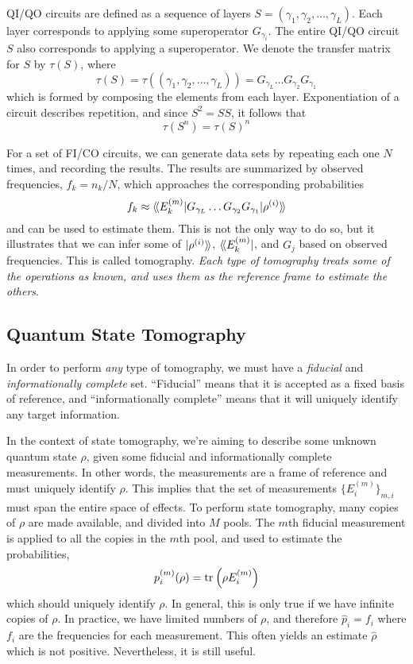 QI/QO circuits are defined as a sequence of layers $S = (\gamma_1, \gamma_2, \dots, \gamma_L)$. Each
layer corresponds to applying some superoperator $G_{\gamma_i}$. The entire QI/QO circuit $S$ also
corresponds to applying a superoperator. We denote the transfer matrix for $S$ by $\tau(S)$, where
\begin{equation}
    \tau(S) = \tau((\gamma_1, \gamma_2, \dots, \gamma_L)) = G_{\gamma_L} \dots G_{\gamma_2} G_{\gamma_1}
\end{equation}
which is formed by composing the elements from each layer. Exponentiation of a circuit describes
repetition, and since $S^2 = SS$, it follows that
\begin{equation}
    \tau(S^n) = \tau(S)^n
\end{equation}

For a set of FI/CO circuits, we can generate data sets by repeating each one $N$ times, and
recording the results. The results are summarized by observed frequencies, $f_k = n_k / N$, which
approaches the corresponding probabilities
\begin{equation}
    f_k \approx \langle\!\braket{E_k^{(m)} | G_{\gamma_L} \dots G_{\gamma_2} G_{\gamma_1} | \rho^{(i)}}\!\rangle
\end{equation}
and can be used to estimate them. This is not the only way to do so, but it illustrates that we can
infer some of $\ket{\rho^{(i)}}\!\rangle$, $\langle\!\bra{E_k^{(m)}}$, and $G_j$ based on observed
frequencies. This is called tomography. \textit{Each type of tomography treats some of the
operations as known, and uses them as the reference frame to estimate the others}.

\subsection{Quantum State Tomography}

In order to perform \textit{any} type of tomography, we must have a \textit{fiducial} and
\textit{informationally complete} set. ``Fiducial'' means that it is accepted as a fixed basis of
reference, and ``informationally complete'' means that it will uniquely identify any target
information. 

In the context of state tomography, we're aiming to describe some unknown quantum state $\rho$,
given some fiducial and informationally complete measurements. In other words, the measurements are
a frame of reference and must uniquely identify $\rho$. This implies that the set of measurements
$\{E_i^{(m)}\}_{m,i}$ must span the entire space of effects. To perform state tomography, many
copies of $\rho$ are made available, and divided into $M$ pools. The $m$th fiducial measurement is
applied to all the copies in the $m$th pool, and used to estimate the probabilities,
\begin{equation}
    p_i^{(m)} (\rho) = \text{tr}_{}\left(\rho E_i^{(m)}\right)
\end{equation}
which should uniquely identify $\rho$. In general, this is only true if we have infinite copies of
$\rho$. In practice, we have limited numbers of $\rho$, and therefore $\hat{p}_i = f_i$ where $f_i$
are the frequencies for each measurement. This often yields an estimate $\hat{\rho}$ which is not
positive. Nevertheless, it is still useful.

